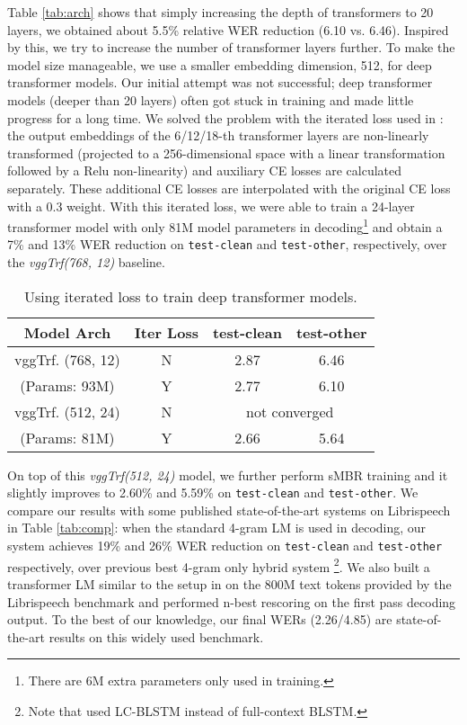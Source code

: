 \documentclass{article}
\begin{document}
Table \ref{tab:arch} shows that simply increasing the depth of transformers to 20 layers, we obtained about 5.5\% relative WER reduction (6.10 vs. 6.46). Inspired by this, we try to increase the number of transformer layers further. To make the model size manageable, we use a smaller embedding dimension, 512, for deep transformer models. Our initial attempt was not successful; deep transformer models (deeper than 20 layers) often got stuck in training and made little progress for a long time. We solved the problem with the iterated loss used in \cite{Andros2019}: the output embeddings of the 6/12/18-th transformer layers are non-linearly transformed (projected to a 256-dimensional space with a linear transformation followed by a Relu non-linearity) and auxiliary CE losses are calculated separately. These additional CE losses are interpolated with the original CE loss with a 0.3 weight. With this iterated loss, we were able to train a 24-layer transformer model with only 81M model parameters in decoding\footnote{There are 6M extra parameters only used in training.} and obtain a 7\% and 13\% WER reduction on \texttt{test-clean} and \texttt{test-other}, respectively, over the \textit{vggTrf(768, 12)} baseline. 



\begin{table}[htb]
    \centering
    \caption{Using iterated loss to train deep transformer models.}
    \begin{tabular}{|c||c|cc|}
    \hline
    Model Arch  & Iter Loss & \rm{test-clean} & \rm{test-other} \\
    \hline\hline
    vggTrf. (768, 12)   &  N & 2.87  & 6.46  \\
    (Params: 93M)    &  Y & 2.77 &  6.10 \\
    \hline
    vggTrf. (512, 24)   & N & \multicolumn{2}{c|}{not converged}  \\
    (Params: 81M) & Y & 2.66 & 5.64 \\
    \hline
    \end{tabular}
    \label{tab:iter_loss}
\end{table}

On top of this \textit{vggTrf(512, 24)} model, we further perform sMBR training and it slightly improves to 2.60\% and 5.59\% on \texttt{test-clean} and \texttt{test-other}. We compare our results with some published state-of-the-art systems on Librispeech in Table \ref{tab:comp}: when the standard 4-gram LM is used in decoding, our system achieves 19\% and 26\% WER  reduction on \texttt{test-clean} and \texttt{test-other} respectively, over previous best 4-gram only hybrid system \cite{le2019senones}\footnote{Note that \cite{le2019senones} used LC-BLSTM \cite{zhang2016highway} instead of full-context BLSTM.}. We also built a transformer LM similar to the setup in \cite{radford2018improving} on the 800M text tokens provided by the Librispeech benchmark and performed n-best rescoring on the first pass decoding output. To the best of our knowledge, our final WERs (2.26/4.85) are state-of-the-art results on this widely used benchmark.
\vspace{-0.5em}
\end{document}
